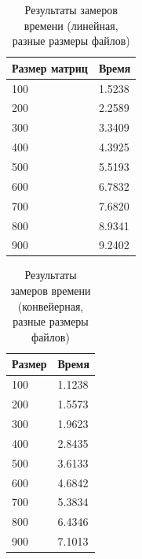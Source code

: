 \begin{table}[h]
    \begin{center}
        \begin{threeparttable}
        \captionsetup{justification=raggedright,singlelinecheck=off}
        \caption{Результаты замеров времени (линейная, разные размеры файлов)}
        \label{tbl:time_lin_size}
        \begin{tabular}{|p{6cm}|p{6cm}|}
            \hline
            Размер матриц & Время \\
            \hline
            100 & 1.5238 \\ \hline 
            200 & 2.2589 \\ \hline 
            300 & 3.3409 \\ \hline 
            400 & 4.3925 \\ \hline 
            500 & 5.5193 \\ \hline 
            600 & 6.7832 \\ \hline 
            700 & 7.6820 \\ \hline 
            800 & 8.9341 \\ \hline 
            900 & 9.2402 \\ \hline 
		\end{tabular}
    \end{threeparttable}
\end{center}
\end{table}


\begin{table}[h]
    \begin{center}
        \begin{threeparttable}
        \captionsetup{justification=raggedright,singlelinecheck=off}
        \caption{Результаты замеров времени (конвейерная, разные размеры файлов)}
        \label{tbl:time_conv_size}
        \begin{tabular}{|p{6cm}|p{6cm}|}
            \hline
            Размер & Время \\
            \hline 
            100 & 1.1238 \\ \hline 
            200 & 1.5573 \\ \hline 
            300 & 1.9623 \\ \hline 
            400 & 2.8435 \\ \hline 
            500 & 3.6133 \\ \hline 
            600 & 4.6842 \\ \hline 
            700 & 5.3834 \\ \hline 
            800 & 6.4346 \\ \hline 
            900 & 7.1013 \\ \hline 
		\end{tabular}
    \end{threeparttable}
\end{center}
\end{table}

